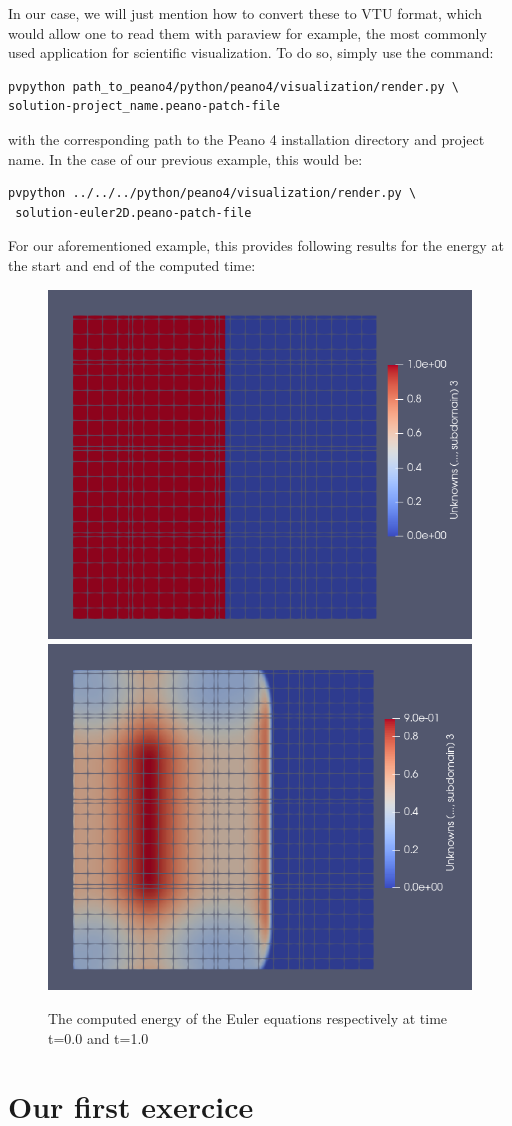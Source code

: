 \documentclass[12pt,letterpaper]{article}
\begin{document}
In our case, we will just mention how to convert these to VTU format, which would allow one to read them with paraview for example, the most commonly used application for scientific visualization.
To do so, simply use the command:
\begin{lstlisting}[style = Bash]
pvpython path_to_peano4/python/peano4/visualization/render.py \
solution-project_name.peano-patch-file
\end{lstlisting}
with the corresponding path to the Peano 4 installation directory and project name. In the case of our previous example, this would be:
\begin{lstlisting}[style = Bash]
pvpython ../../../python/peano4/visualization/render.py \
 solution-euler2D.peano-patch-file
\end{lstlisting}
For our aforementioned example, this provides following results for the energy at the start and end of the computed time:

\begin{figure}[!h]
\centering
\includegraphics[width=0.40\linewidth]{pictures/euler2D_start.png}
\includegraphics[width=0.40\linewidth]{pictures/euler2D_end.png}
\caption{The computed energy of the Euler equations respectively at time t=0.0 and t=1.0}
\end{figure}

\newpage

\section{Our first exercice}
\vspace{0.2cm}
\end{document}
